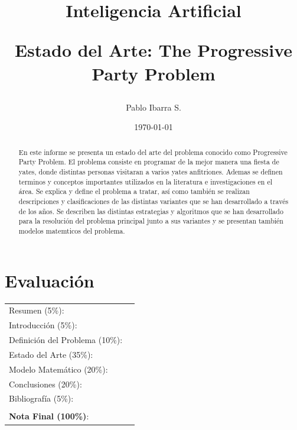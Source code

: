 \documentclass[spanish, fleqn]{article}
\begin{document}
\title{Inteligencia Artificial \\ \begin{Large}Estado del Arte: The Progressive Party Problem\end{Large}}
\author{Pablo Ibarra S.}
\date{\today}
\maketitle

\section*{Evaluación}

\begin{tabular}{ll}
Resumen (5\%): & \underline{\hspace{2cm}} \\
Introducción (5\%):  & \underline{\hspace{2cm}} \\
Definición del Problema (10\%):  & \underline{\hspace{2cm}} \\
Estado del Arte (35\%):  & \underline{\hspace{2cm}} \\
Modelo Matemático (20\%): &  \underline{\hspace{2cm}}\\
Conclusiones (20\%): &  \underline{\hspace{2cm}}\\
Bibliografía (5\%): & \underline{\hspace{2cm}}\\
 &  \\
\textbf{Nota Final (100\%)}:   & \underline{\hspace{2cm}}
\end{tabular}

\begin{abstract}
En este informe se presenta un estado del arte del problema conocido como Progressive Party Problem. El problema consiste en programar de la mejor manera una fiesta de yates, donde distintas personas visitaran a varios yates anfitriones. Ademas se definen terminos y conceptos importantes utilizados en la literatura e investigaciones en el área. Se explica y define el problema a tratar, así como también se realizan descripciones y clasificaciones de las distintas variantes que se han desarrollado a través de los años. Se describen las distintas estrategias y algoritmos que se han desarrollado para la resolución del problema principal junto a sus variantes y se presentan también modelos matemticos del problema.
\end{abstract}
\end{document}
